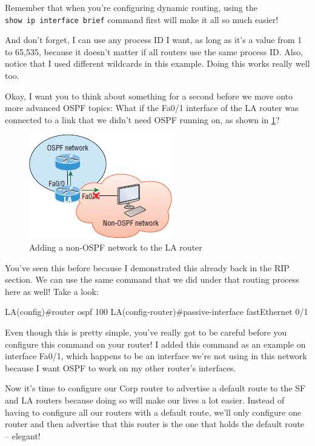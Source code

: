 Remember that when you're configuring dynamic routing, using the \texttt{show\ ip\ interface\ brief} command first will make it all so much easier!

And don't forget, I can use any process ID I want, as long as it's a
value from 1 to 65,535, because it doesn't matter if all routers use the
same process ID. Also, notice that I used different wildcards in this
example. Doing this works really well too.

Okay, I want you to think about something for a second before we move
onto more advanced OSPF topics: What if the Fa0/1 interface of the LA
router was connected to a link that we didn't need OSPF running on, as
shown in \cref{fig:ospf-add-non-ospf-network}?

\begin{figure}
   \centering
   \includegraphics[width=.5\textwidth]{images/c18f005.jpg}
   \caption{Adding a non-OSPF network to the LA router}
   \label{fig:ospf-add-non-ospf-network}
\end{figure}

You've seen this before because I demonstrated this already back in the
RIP section. We can use the same command that we did under that routing
process here as well! Take a look:

\begin{cli}
LA(config)#router ospf 100
LA(config-router)#passive-interface fastEthernet 0/1
\end{cli}

Even though this is pretty simple, you've really got to be careful
before you configure this command on your router! I added this command
as an example on interface Fa0/1, which happens to be an interface we're
not using in this network because I want OSPF to work on my other
router's interfaces.

Now it's time to configure our Corp router to advertise a default route to the SF and LA
routers because doing so will make our lives a lot easier. Instead of
having to configure all our routers with a default route, we'll only
configure one router and then advertise that this router is the one that
holds the default route -- elegant!

